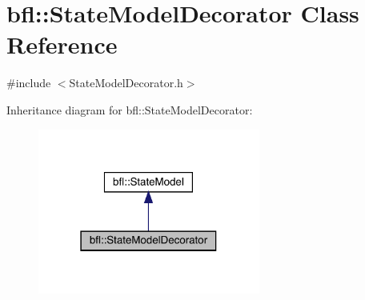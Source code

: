 \hypertarget{classbfl_1_1StateModelDecorator}{}\section{bfl\+:\+:State\+Model\+Decorator Class Reference}
\label{classbfl_1_1StateModelDecorator}


{\ttfamily \#include $<$State\+Model\+Decorator.\+h$>$}



Inheritance diagram for bfl\+:\+:State\+Model\+Decorator\+:
\nopagebreak
\begin{figure}[H]
\begin{center}
\leavevmode
\includegraphics[width=207pt]{classbfl_1_1StateModelDecorator__inherit__graph}
\end{center}
\end{figure}
